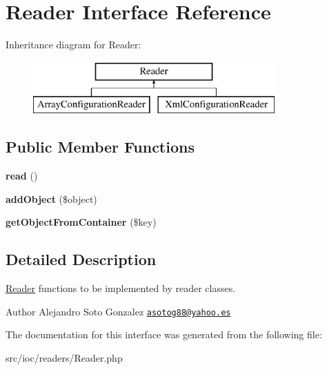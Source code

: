 \hypertarget{interface_reader}{\section{Reader Interface Reference}
\label{interface_reader}
}
Inheritance diagram for Reader\-:\begin{figure}[H]
\begin{center}
\leavevmode
\includegraphics[height=2.000000cm]{interface_reader}
\end{center}
\end{figure}
\subsection*{Public Member Functions}
\begin{DoxyCompactItemize}
\item 
\hypertarget{interface_reader_a64571309bfb3238c65fd3c2898f92440}{{\bfseries read} ()}\label{interface_reader_a64571309bfb3238c65fd3c2898f92440}

\item 
\hypertarget{interface_reader_ab10a1fa095c486bea43aadd057baaf78}{{\bfseries add\-Object} (\$object)}\label{interface_reader_ab10a1fa095c486bea43aadd057baaf78}

\item 
\hypertarget{interface_reader_af6fa42b05b84795a316a1ebf2a154d6d}{{\bfseries get\-Object\-From\-Container} (\$key)}\label{interface_reader_af6fa42b05b84795a316a1ebf2a154d6d}

\end{DoxyCompactItemize}


\subsection{Detailed Description}
\hyperlink{interface_reader}{Reader} functions to be implemented by reader classes.

\begin{DoxyAuthor}{Author}
Alejandro Soto Gonzalez \href{mailto:asotog88@yahoo.es}{\tt asotog88@yahoo.\-es} 
\end{DoxyAuthor}


The documentation for this interface was generated from the following file\-:\begin{DoxyCompactItemize}
\item 
src/ioc/readers/Reader.\-php\end{DoxyCompactItemize}
